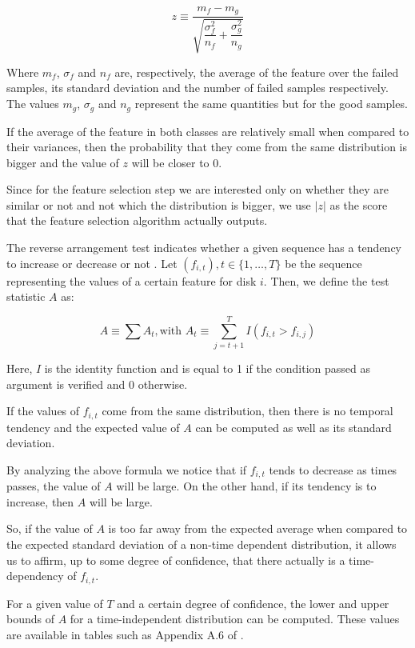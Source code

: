 \begin{equation}
  z \equiv \dfrac{m_f - m_g}{\sqrt{\dfrac{\sigma_f^2}{n_f} + \dfrac{\sigma_g^2}{n_g}}}
\end{equation}

Where $m_f$, $\sigma_f$ and $n_f$ are, respectively, the average of the feature over the failed samples, its standard deviation and the number of failed samples respectively. 
The values $m_g$, $\sigma_g$ and $n_g$ represent the same quantities but for the good samples.

If the average of the feature in both classes are relatively small when compared to their variances, then the probability that they come from the same distribution is bigger and the value of $z$ will be closer to 0.

Since for the feature selection step we are interested only on whether they are similar or not and not which the distribution is bigger, we use $|z|$ as the score that the feature selection algorithm actually outputs.

The reverse arrangement test indicates whether a given sequence has a tendency to increase or decrease or not \cite{Murray2005}.
Let $(f_{i,t}), t \in \{1,\dots,T\}$ be the sequence representing the values of a certain feature for disk $i$.
Then, we define the test statistic $A$ as:

\begin{equation}\label{eq:reverse_arrangement}
  A \equiv \sum A_t, \text{with } A_t \equiv \sum_{j=t+1}^{T} I(f_{i, t} > f_{i, j})
\end{equation}

Here, $I$ is the identity function and is equal to 1 if the condition passed as argument is verified and 0 otherwise.

If the values of $f_{i,t}$ come from the same distribution, then there is no temporal tendency and the expected value of $A$ can be computed as well as its standard deviation.

By analyzing the above formula we notice that if $f_{i,t}$ tends to decrease as times passes, the value of $A$ will be large.
On the other hand, if its tendency is to increase, then $A$ will be large.

So, if the value of $A$ is too far away from the expected average when compared to the expected standard deviation of a non-time dependent distribution, it allows us to affirm, up to some degree of confidence, that there actually is a time-dependency of $f_{i,t}$.

For a given value of $T$ and a certain degree of confidence, the lower and upper bounds of $A$ for a time-independent distribution can be computed.
These values are available in tables such as Appendix A.6 of \cite{bendat2011random}.

